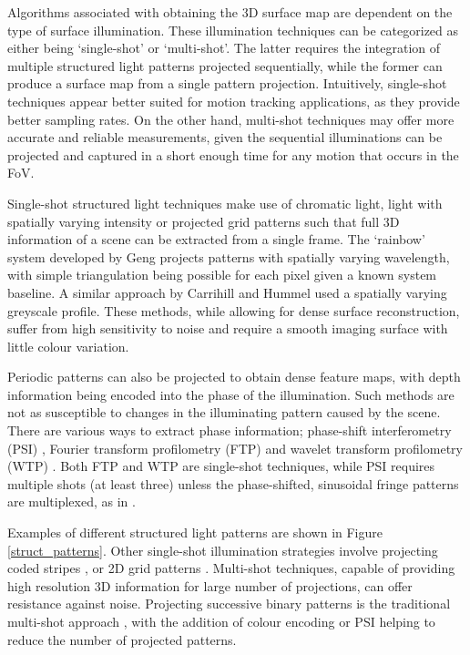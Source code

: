 \documentclass[class=article, crop=false]{standalone}
\begin{document}
\par
Algorithms associated with obtaining the 3D surface map are dependent on the type of surface illumination. These illumination techniques can be categorized as either being ‘single-shot’ or ‘multi-shot’. The latter requires the integration of multiple structured light patterns projected sequentially, while the former can produce a surface map from a single pattern projection. Intuitively, single-shot techniques appear better suited for motion tracking applications, as they provide better sampling rates. On the other hand, multi-shot techniques may offer more accurate and reliable measurements, given the sequential illuminations can be projected and captured in a short enough time for any motion that occurs in the FoV. 
\par
Single-shot structured light techniques make use of chromatic light, light with spatially varying intensity or projected grid patterns such that full 3D information of a scene can be extracted from a single frame. The `rainbow' system developed by Geng \parencite*{JasonGeng1996} projects patterns with spatially varying wavelength, with simple triangulation being possible for each pixel given a known system baseline. A similar approach by Carrihill and Hummel \parencite*{Carrihill1985} used a spatially varying greyscale profile. These methods, while allowing for dense surface reconstruction, suffer from high sensitivity to noise and require a smooth imaging surface with little colour variation.
\par
Periodic patterns can also be projected to obtain dense feature maps, with depth information being encoded into the phase of the illumination. Such methods are not as susceptible to changes in the illuminating pattern caused by the scene. There are various ways to extract phase information; phase-shift interferometry (PSI) \parencite{ISI:A1974U657500060,Huang1999}, Fourier transform profilometry (FTP) \parencite{Takeda:83,Yue20071170} and wavelet transform profilometry (WTP) \parencite{Gdeisat2006482,Fernandez2010}. Both FTP and WTP are single-shot techniques, while PSI requires multiple shots (at least three) unless the phase-shifted, sinusoidal fringe patterns are multiplexed, as in \cite{Huang1999}.
\par
Examples of different structured light patterns are shown in Figure \ref{struct_patterns}. Other single-shot illumination strategies involve projecting coded stripes \parencite{Boyer1987,Forster2007,Zhang2002}, or 2D grid patterns \parencite{Petriu2000,Pages2006,Albitar2006}. Multi-shot techniques, capable of providing high resolution 3D information for large number of projections, can offer resistance against noise. Projecting successive binary patterns is the traditional multi-shot approach \parencite{Posdamer1982}, with the addition of colour encoding \parencite{Caspi1998} or PSI \parencite{Huang2006} helping to reduce the number of projected patterns.
\end{document}
